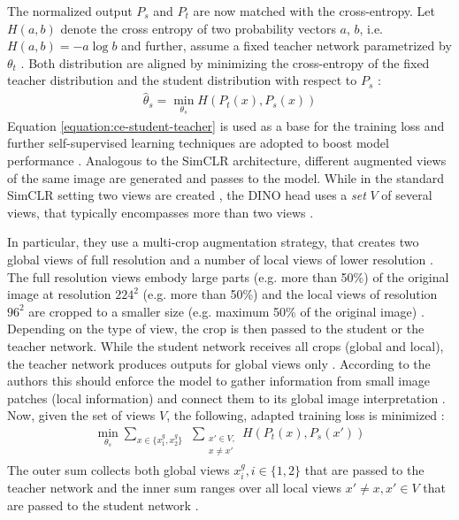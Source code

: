 \par
The normalized output $P_s$ and $P_t$ are now matched with the cross-entropy.
Let $H(a,b)$ denote the cross entropy of two probability vectors $a$, $b$, i.e. $H(a,b)=-a \log b$ and further, assume a fixed teacher network parametrized by $\theta_t$ \citep{Caron2021}.
Both distribution are aligned by minimizing the cross-entropy of the fixed teacher distribution and the student distribution with respect to $P_s$ \citep{Caron2021}: 
\begin{align}
	\hat{\theta}_s = \min_{\theta_s}H(P_t(x),P_s(x))
	\label{equation:ce-student-teacher}	
\end{align}
Equation \ref{equation:ce-student-teacher} is used as a base for the training loss and further self-supervised learning techniques are adopted to boost model performance \citep{Caron2021}.
Analogous to the SimCLR architecture, different augmented views of the same image are generated and passes to the model.
While in the standard SimCLR setting two views are created \citep{Chen2020}, the DINO head uses a \textit{set} $V$ of several views, that typically encompasses more than two views \citep{Caron2021}.
\par
In particular, they use a multi-crop augmentation strategy, that creates two global views of full resolution and a number of local views of lower resolution \citep{Caron2020, Caron2021}. 
The full resolution views embody large parts (e.g. more than 50\%) of the original image at resolution $224^2$ (e.g. more than 50\%) and the local views of resolution $96^2$ are cropped to a smaller size (e.g. maximum 50\% of the original image) \citep{Caron2021}.
Depending on the type of view, the crop is then passed to the student or the teacher network.
While the student network receives all crops (global and local), the teacher network produces outputs for global views only \citep{Caron2021}.
According to the authors this should enforce the model to gather information from small image patches (local information) and connect them to its global image interpretation \citep{Caron2021}.
Now, given the set of views $V$, the following, adapted training loss is minimized \citep{Caron2021}:
\begin{align}
	\min_{\theta_s}\sum_{x \in \{x_1^g, x_2^g\}} \hspace{5pt} \sum_{\substack{ x\prime \in V, \\ x\neq x\prime}} H(P_t(x),P_s(x\prime))
	\label{equation:dino-training-objective}
\end{align}
The outer sum collects both global views $x_i^g, i\in\{1,2\}$ that are passed to the teacher network and the inner sum ranges over all local views $x\prime \neq x, x \prime \in V $ that are passed to the student network \citep{Caron2021}.
